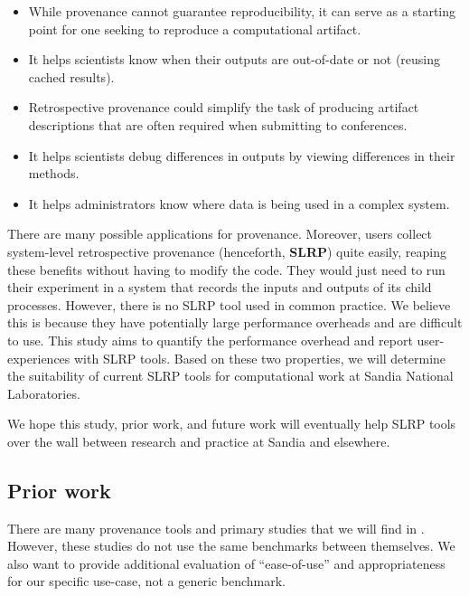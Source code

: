 \begin{itemize}
\item
While provenance cannot guarantee reproducibility, it can serve as a starting point for one seeking to reproduce a computational artifact.

\item
It helps scientists know when their outputs are out-of-date or not (reusing cached results).

\item
Retrospective provenance could simplify the task of producing artifact descriptions that are often required when submitting to conferences.

\item
It helps scientists debug differences in outputs by viewing differences in their methods.

\item
It helps administrators know where data is being used in a complex system.
\end{itemize}

There are many possible applications for provenance.
Moreover, users collect system-level retrospective provenance (henceforth, \textbf{SLRP}) quite easily, reaping these benefits without having to modify the code.
They would just need to run their experiment in a system that records the inputs and outputs of its child processes.
However, there is no SLRP tool used in common practice.
We believe this is because they have potentially large performance overheads and are difficult to use.
This study aims to quantify the performance overhead and report user-experiences with SLRP tools.
Based on these two properties, we will determine the suitability of current SLRP tools for computational work at Sandia National Laboratories.

We hope this study, prior work, and future work will eventually help SLRP tools over the wall between research and practice at Sandia and elsewhere.

\subsection{Prior work}

There are many provenance tools and primary studies that we will find in .
However, these studies do not use the same benchmarks between themselves.
We also want to provide additional evaluation of ``ease-of-use'' and appropriateness for our specific use-case, not a generic benchmark.

